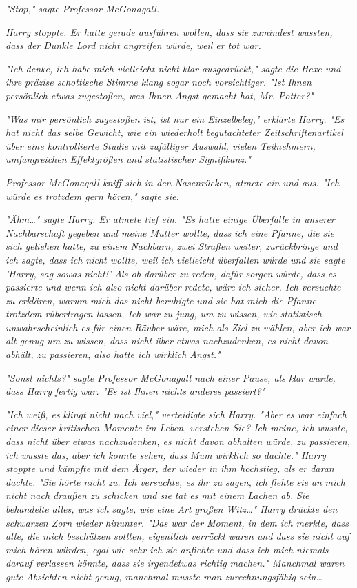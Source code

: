 {\emph{"Stop," sagte Professor McGonagall.}

\emph{Harry stoppte. Er hatte gerade ausführen wollen, dass sie zumindest wussten, dass der Dunkle Lord nicht angreifen würde, weil er tot war.}

\emph{"Ich denke, ich habe mich vielleicht nicht klar ausgedrückt," sagte die Hexe und ihre präzise schottische Stimme klang sogar noch vorsichtiger. "Ist} \emph{\emph{Ihnen persönlich}} \emph{etwas zugestoßen, was Ihnen Angst gemacht hat, Mr. Potter?"}

\emph{"Was mir persönlich zugestoßen ist, ist nur ein Einzelbeleg," erklärte Harry. "Es hat nicht das selbe Gewicht, wie ein wiederholt begutachteter Zeitschriftenartikel über eine kontrollierte Studie mit zufälliger Auswahl, vielen Teilnehmern, umfangreichen Effektgrößen und statistischer Signifikanz."}

\emph{Professor McGonagall kniff sich in den Nasenrücken, atmete ein und aus. "Ich würde es trotzdem gern hören," sagte sie.}

\emph{"Ähm…" sagte Harry. Er atmete tief ein. "Es hatte einige Überfälle in unserer Nachbarschaft gegeben und meine Mutter wollte, dass ich eine Pfanne, die sie sich geliehen hatte, zu einem Nachbarn, zwei Straßen weiter, zurückbringe und ich sagte, dass ich nicht wollte, weil ich vielleicht überfallen würde und sie sagte 'Harry, sag sowas nicht!' Als ob darüber zu reden, dafür} \emph{\emph{sorgen}} \emph{würde, dass es passierte und wenn ich also nicht darüber redete, wäre ich sicher. Ich versuchte zu erklären, warum mich das nicht beruhigte und sie hat mich die Pfanne trotzdem rübertragen lassen. Ich war zu jung, um zu wissen, wie statistisch unwahrscheinlich es für einen Räuber wäre, mich als Ziel zu wählen, aber ich war alt genug um zu wissen, dass nicht über etwas nachzudenken, es nicht davon abhält, zu passieren, also hatte ich wirklich Angst."}

\emph{"Sonst nichts?" sagte Professor McGonagall nach einer Pause, als klar wurde, dass Harry fertig war. "Es ist Ihnen nichts} \emph{\emph{anderes}} \emph{passiert?"}

\emph{"Ich weiß, es} \emph{\emph{klingt}} \emph{nicht nach viel," verteidigte sich Harry. "Aber es war einfach einer dieser kritischen Momente im Leben, verstehen Sie? Ich meine, ich} \emph{\emph{wusste}, dass nicht über etwas nachzudenken, es nicht davon abhalten würde, zu passieren, ich} \emph{\emph{wusste}} \emph{das, aber ich konnte sehen, dass} \emph{Mum wirklich so dachte." Harry stoppte und kämpfte mit dem Ärger, der wieder in ihm hochstieg, als er daran dachte. "Sie} \emph{\emph{hörte nicht zu.}} \emph{Ich versuchte, es ihr zu sagen, ich} \emph{\emph{flehte sie an}} \emph{mich nicht nach draußen zu schicken und sie} \emph{\emph{tat es mit einem Lachen ab.}} \emph{Sie behandelte alles, was ich sagte, wie eine Art großen Witz…" Harry drückte den schwarzen Zorn wieder hinunter. "Das war der Moment, in dem ich merkte, dass alle, die mich beschützen sollten, eigentlich verrückt waren und dass sie nicht auf mich hören würden, egal wie sehr ich sie anflehte und dass ich mich niemals darauf verlassen könnte, dass sie irgendetwas richtig machen." Manchmal waren gute Absichten nicht genug, manchmal musste man zurechnungsfähig sein…}

}
